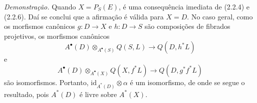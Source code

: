\emph{Demonstração.} Quando $X=P_S(E)$, é uma consequência imediata de (2.2.4) e (2.2.6). Daí se conclui que a afirmação é válida para $X=D$. No caso geral, como os morfismos canônicos $g:D\to X$ e $h:D\to S$ são composições de fibrados projetivos, os morfismos canônicos
\[
A^\bullet(D)\otimes_{A^\bullet(S)}Q(S,L)\to Q(D,h^*L)
\]
e
\[
A^\bullet(D)\otimes_{A^\bullet(X)}Q(X,f^*L)\to Q(D,g^*f^*L)
\]
são isomorfismos. Portanto, $\mathrm{id}_{A^*(D)}\otimes\alpha$ é um isomorfismo, de onde se segue o resultado, pois $A^*(D)$ é livre sobre $A^*(X)$.
